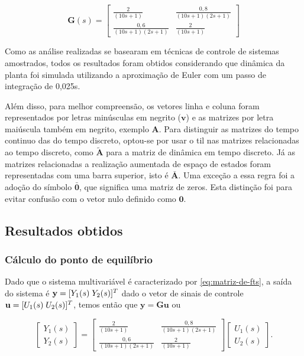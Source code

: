 \begin{equation}
    \label{eq:matriz-de-fts}
    \mathbf{G}(s) =
    \begin{bmatrix}
        \frac{2}{(10s+1)}         & \frac{0,8}{(10s+1)(2s+1)} \\
        \frac{0,6}{(10s+1)(2s+1)} & \frac{2}{(10s+1)}
    \end{bmatrix}
\end{equation}

Como as análise realizadas se basearam em técnicas de controle de sistemas
amostrados, todos os resultados foram obtidos considerando que dinâmica da
planta foi simulada utilizando a aproximação de Euler com um passo de integração
de 0,025s.

Além disso, para melhor compreensão, os vetores linha e coluna foram
representados por letras minúsculas em negrito ($\mathbf{v}$) e as
matrizes por letra maiúscula também em negrito, exemplo $\mathbf{A}$. Para
distinguir as matrizes do tempo continuo das do tempo discreto, optou-se por
usar o til nas matrizes relacionadas ao tempo discreto, como
$\mathbf{\tilde{A}}$ para a matriz de dinâmica em tempo discreto. Já as matrizes
relacionadas a realização aumentada de espaço de estados foram representadas com
uma barra superior, isto é $\mathbf{\bar{A}}$. Uma exceção a essa regra foi a
adoção do símbolo $\mathbf{\bar{0}}$, que significa uma matriz de zeros. Esta
distinção foi para evitar confusão com o vetor nulo definido como $\mathbf{0}$.

\subsection{Resultados obtidos}
\label{sub:resultados-obtidos-desafio6}

\subsubsection{Cálculo do ponto de equilíbrio}
\label{subsub:calculo-do-ponto-de-equilibrio}
Dado que o sistema multivariável é caracterizado por \ref{eq:matriz-de-fts}, a
saída do sistema é $\mathbf{y} = [Y_1(s) \thickspace Y_2(s)]^{T}$ dado o vetor de
sinais de controle $\mathbf{u} = [U_1(s) \thickspace U_2(s)]^{T}$, temos então que
$\mathbf{y} = \mathbf{G}\mathbf{u}$ ou

\begin{equation}
    \label{eq:relacao-entrada-saida-de-g}
    \begin{bmatrix}
        Y_1(s) \\
        Y_2(s)
    \end{bmatrix}
    =
    \begin{bmatrix}
        \frac{2}{(10s+1)}         & \frac{0,8}{(10s+1)(2s+1)} \\
        \frac{0,6}{(10s+1)(2s+1)} & \frac{2}{(10s+1)}
    \end{bmatrix}
    \begin{bmatrix}
        U_1(s) \\
        U_2(s)
    \end{bmatrix}.
\end{equation}

